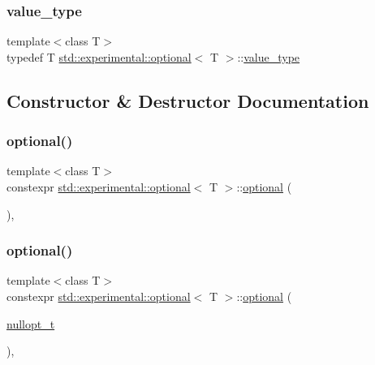 \subsubsection{\texorpdfstring{value\+\_\+type}{value\_type}}
{\footnotesize\ttfamily template$<$class T$>$ \\
typedef T \mbox{\hyperlink{classstd_1_1experimental_1_1optional}{std\+::experimental\+::optional}}$<$ T $>$\+::\mbox{\hyperlink{classstd_1_1experimental_1_1optional_a3b480b4a74492ffdbcc9d8529ed512fc}{value\+\_\+type}}}



\subsection{Constructor \& Destructor Documentation}
\mbox{\label{classstd_1_1experimental_1_1optional_a1584b48b65b92c4666c9899cd8b034e0}} 
\subsubsection{\texorpdfstring{optional()}{optional()}\hspace{0.1cm}{\footnotesize\ttfamily [1/8]}}
{\footnotesize\ttfamily template$<$class T$>$ \\
constexpr \mbox{\hyperlink{classstd_1_1experimental_1_1optional}{std\+::experimental\+::optional}}$<$ T $>$\+::\mbox{\hyperlink{classstd_1_1experimental_1_1optional}{optional}} (\begin{DoxyParamCaption}{ }\end{DoxyParamCaption})\hspace{0.3cm}{\ttfamily [inline]}, {\ttfamily [noexcept]}}

\mbox{\label{classstd_1_1experimental_1_1optional_a4254acbb52e75c196ab02784ce4b1ce2}} 
\subsubsection{\texorpdfstring{optional()}{optional()}\hspace{0.1cm}{\footnotesize\ttfamily [2/8]}}
{\footnotesize\ttfamily template$<$class T$>$ \\
constexpr \mbox{\hyperlink{classstd_1_1experimental_1_1optional}{std\+::experimental\+::optional}}$<$ T $>$\+::\mbox{\hyperlink{classstd_1_1experimental_1_1optional}{optional}} (\begin{DoxyParamCaption}\item[{\mbox{\hyperlink{structstd_1_1experimental_1_1nullopt__t}{nullopt\+\_\+t}}}]{ }\end{DoxyParamCaption})\hspace{0.3cm}{\ttfamily [inline]}, {\ttfamily [noexcept]}}

